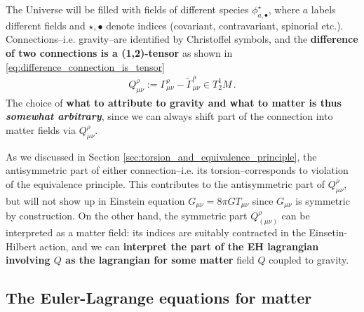 \begin{mytheorem}
%
The Universe will be filled with fields of different species $\phi^\star_{a,\bullet}$, where $a$ labels different fields and $\star,\bullet$ denote indices (covariant, contravariant, spinorial etc.).
Connections--i.e. gravity--are identified by Christoffel symbols, and the \textbf{difference of two connections is a (1,2)-tensor} as shown in \eqref{eq:difference_connection_is_tensor}
\begin{align}
    Q^\rho_{\mu\nu} := \Gamma^\rho_{\mu\nu} - \tilde{\Gamma}^\rho_{\mu\nu} \in T_2^1M\,.
\end{align}
The choice of \textbf{what to attribute to gravity and what to matter is thus \emph{somewhat arbitrary}}, since we can always shift part of the connection into matter fields via $Q^\rho_{\mu\nu}$.

As we discussed in Section \ref{sec:torsion_and_equivalence_principle}, the  antisymmetric part of either connection--i.e. its torsion--corresponds to violation of the equivalence principle.
This contributes to the antisymmetric part of $Q^\rho_{\mu\nu}$, but will not show up in Einstein equation $G_{\mu\nu} = 8\pi G T_{\mu\nu}$ since $G_{\mu\nu}$ is symmetric by construction.
On the other hand, the symmetric part $Q^\rho_{(\mu\nu)}$ can be interpreted as a matter field: its indices are suitably contracted in the Einsetin-Hilbert action, and we can \textbf{interpret the part of the EH lagrangian involving $Q$ as the lagrangian for some matter} field $Q$ coupled to gravity.
%
\end{mytheorem}



\subsection{The Euler-Lagrange equations for matter}


